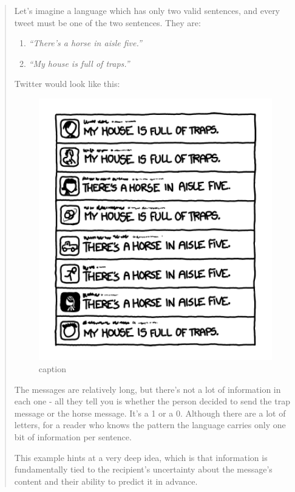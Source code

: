 \begin{quotation}
Let's imagine a language which has only two valid sentences, and every tweet must be one of the two sentences. They are:

\begin{enumerate}
\item {\em“There’s a horse in aisle five.”}
\item {\em“My house is full of traps.”}
\end{enumerate}

Twitter would look like this:

\begin{figure}[h]
\begin{center}
\includegraphics[width=4in]{huffman/twitter-screenshot.png}
\end{center}
\caption{caption} %
\end{figure}


The messages are relatively long, but there’s not a lot of information in each one - all they tell you is whether the person decided to send the trap message or the horse message. It's a 1 or a 0. Although there are a lot of letters, for a reader who knows the pattern the language carries only one bit of information per sentence.

This example hints at a very deep idea, which is that information is fundamentally tied to the recipient’s uncertainty about the message’s content and their ability to predict it in advance.


\end{quotation}
